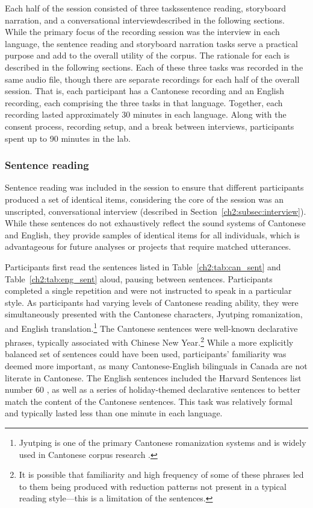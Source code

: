 Each half of the session consisted of three tasks\textemdash sentence reading, storyboard narration, and a conversational interview\textemdash described in the following sections. While the primary focus of the recording session was the interview in each language, the sentence reading and storyboard narration tasks serve a practical purpose and add to the overall utility of the corpus. The rationale for each is described in the following sections. Each of these three tasks was recorded in the same audio file, though there are separate recordings for each half of the overall session. That is, each participant has a Cantonese recording and an English recording, each comprising the three tasks in that language. Together, each recording lasted approximately 30 minutes in each language. Along with the consent process, recording setup, and a break between interviews, participants spent up to 90 minutes in the lab. 

\subsubsection{Sentence reading}\label{ch2:subsec:sentences}
Sentence reading was included in the session to ensure that different participants produced a set of identical items, considering the core of the session was an unscripted, conversational interview (described in Section~\ref{ch2:subsec:interview}). While these sentences do not exhaustively reflect the sound systems of Cantonese and English, they provide samples of identical items for all individuals, which is advantageous for future analyses or projects that require matched utterances.

Participants first read the sentences listed in Table~\ref{ch2:tab:can_sent} and Table~\ref{ch2:tab:eng_sent} aloud, pausing between sentences. Participants completed a single repetition and were not instructed to speak in a particular style. As participants had varying levels of Cantonese reading ability, they were simultaneously presented with the Cantonese characters, Jyutping romanization, and English translation.\footnote{Jyutping is one of the primary Cantonese romanization systems \citep{matthews_2013_cantonese} and is widely used in Cantonese corpus research \citep{nagy_2011_hlvc, tse_2019_heritage}.} The Cantonese sentences were well-known declarative phrases, typically associated with Chinese New Year.\footnote{It is possible that familiarity and high frequency of some of these phrases led to them being produced with reduction patterns not present in a typical reading style---this is a limitation of the sentences.} While a more explicitly balanced set of sentences could have been used, participants' familiarity was deemed more important, as many Cantonese-English bilinguals in Canada are not literate in Cantonese. The English sentences included the Harvard Sentences list number 60 \citep{ieee_1969_sentences}, as well as a series of holiday-themed declarative sentences to better match the content of the Cantonese sentences. This task was relatively formal and typically lasted less than one minute in each language. 

